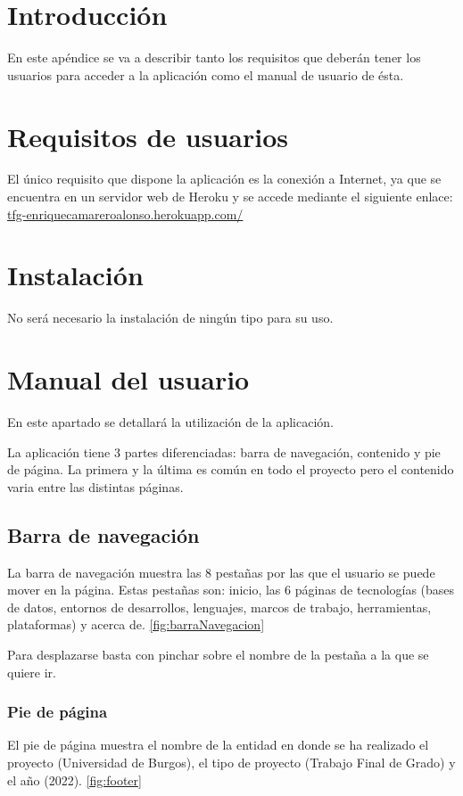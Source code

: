 
\section{Introducción}
En este apéndice se va a describir tanto los requisitos que deberán tener los usuarios para acceder a la aplicación como el manual de usuario de ésta.

\section{Requisitos de usuarios}
El único requisito que dispone la aplicación es la conexión a Internet, ya que se encuentra en un servidor web de Heroku y se accede mediante el siguiente enlace: \href{https://tfg-enriquecamareroalonso.herokuapp.com/}{tfg-enriquecamareroalonso.herokuapp.com/}

\section{Instalación}
No será necesario la instalación de ningún tipo para su uso.

\section{Manual del usuario}
En este apartado se detallará la utilización de la aplicación.

La aplicación tiene 3 partes diferenciadas: barra de navegación, contenido y pie de página. La primera y la última es común en todo el proyecto pero el contenido varia entre las distintas páginas.

\subsection{Barra de navegación}
La barra de navegación muestra las 8 pestañas por las que el usuario se puede mover en la página. Estas pestañas son: inicio, las 6 páginas de tecnologías (bases de datos, entornos de desarrollos, lenguajes, marcos de trabajo, herramientas, plataformas) y acerca de. \ref{fig:barraNavegacion}

Para desplazarse basta con pinchar sobre el nombre de la pestaña a la que se quiere ir.


\subsubsection{Pie de página}
El pie de página muestra el nombre de la entidad en donde se ha realizado el proyecto (Universidad de Burgos), el tipo de proyecto (Trabajo Final de Grado) y el año (2022). \ref{fig:footer}

